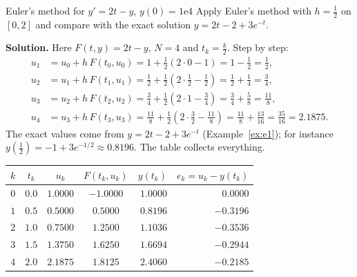 \documentclass[11pt]{article}
\begin{document}
\begin{exmp}{Euler's method for $y'=2t-y$, $y(0)=1$}{e4}
Apply Euler's method with $h=\frac12$ on $[0,2]$ and compare with the exact solution $y=2t-2+3e^{-t}$.

\textbf{Solution.} Here $F(t,y)=2t-y$, $N=4$ and $t_k=\frac k2$. Step by step:
\begin{align*}
u_1&=u_0+h\,F(t_0,u_0)=1+\tfrac12(2\cdot0-1)=1-\tfrac12=\tfrac12,\\
u_2&=u_1+h\,F(t_1,u_1)=\tfrac12+\tfrac12\left(2\cdot\tfrac12-\tfrac12\right)=\tfrac12+\tfrac14=\tfrac34,\\
u_3&=u_2+h\,F(t_2,u_2)=\tfrac34+\tfrac12\left(2\cdot1-\tfrac34\right)=\tfrac34+\tfrac58=\tfrac{11}8,\\
u_4&=u_3+h\,F(t_3,u_3)=\tfrac{11}8+\tfrac12\left(2\cdot\tfrac32-\tfrac{11}8\right)=\tfrac{11}8+\tfrac{13}{16}=\tfrac{35}{16}=2.1875.
\end{align*}
The exact values come from $y=2t-2+3e^{-t}$ (Example~\ref{ex:e1}); for instance $y(\frac12)=-1+3e^{-1/2}\approx0.8196$. The table collects everything.
\begin{center}
\begin{tabular}{ccccrr}
\toprule $k$ & $t_k$ & $u_k$ & $F(t_k,u_k)$ & $y(t_k)$ & $e_k=u_k-y(t_k)$ \\\midrule
$0$ & $0.0$ & $1.0000$ & $-1.0000$ & $1.0000$ & $0.0000$\\
$1$ & $0.5$ & $0.5000$ & $0.5000$ & $0.8196$ & $-0.3196$\\
$2$ & $1.0$ & $0.7500$ & $1.2500$ & $1.1036$ & $-0.3536$\\
$3$ & $1.5$ & $1.3750$ & $1.6250$ & $1.6694$ & $-0.2944$\\
$4$ & $2.0$ & $2.1875$ & $1.8125$ & $2.4060$ & $-0.2185$\\
\bottomrule
\end{tabular}

\end{center}
\end{exmp}
\end{document}
